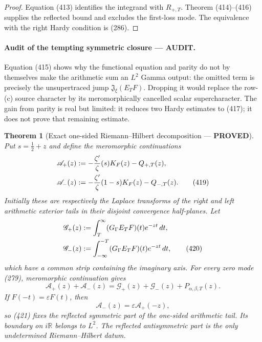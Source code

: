 \documentclass[11pt]{article}
\newtheorem{theorem}{Theorem}
\newcommand{\PROVED}{\textcolor{green!45!black}{\textbf{PROVED}}}
\newcommand{\AUDIT}{\textcolor{orange!75!black}{\textbf{AUDIT}}}
\begin{document}
\begin{proof}
Equation (413) identifies the integrand with $R_{+,T}$.  Theorem
(414)--(416) supplies the reflected bound and excludes the first-loss mode.
The equivalence with the right Hardy condition is (286).
\end{proof}

\paragraph{Audit of the tempting symmetric closure --- \AUDIT.}
Equation (415) shows why the functional equation and parity do not by
themselves make the arithmetic sum an $L^2$ Gamma output: the omitted term
is precisely the unsupertraced jump $\mathfrak J_\xi(E_TF)$.  Dropping it would
replace the row-(c) source character by its meromorphically cancelled scalar
supercharacter.  The gain from parity is real but limited: it reduces two
Hardy estimates to (417); it does not prove that remaining estimate.

\begin{theorem}[Exact one-sided Riemann--Hilbert decomposition --- \PROVED]
Put $s=\tfrac12+z$ and define the meromorphic continuations
\begin{align}
 \mathscr A_+(z)&:=-\frac{\zeta'}{\zeta}(s)K_F(z)-Q_{+,T}(z),\notag\\
 \mathscr A_-(z)&:=-\frac{\zeta'}{\zeta}(1-s)K_F(z)-Q_{-,T}(z).       \tag{419}
\end{align}
Initially these are respectively the Laplace transforms of the right and
left arithmetic exterior tails in their disjoint convergence half-planes.
Let
\begin{align}
 \mathscr G_+(z)&:=\int_T^\infty
          (G_\Gamma E_TF)(t)e^{-zt}\,dt,\notag\\
 \mathscr G_-(z)&:=\int_{-\infty}^{-T}
          (G_\Gamma E_TF)(t)e^{-zt}\,dt,             \tag{420}
\end{align}
which have a common strip containing the imaginary axis.  For every zero
mode (279), meromorphic continuation gives
\begin{equation}
 \boxed{\mathscr A_+(z)+\mathscr A_-(z)
 =\mathscr G_+(z)+\mathscr G_-(z)
  +P_{\alpha,\beta,T}(z).}                           \tag{421}
\end{equation}
If $F(-t)=\varepsilon F(t)$, then
\begin{equation}
 \mathscr A_-(z)=\varepsilon\mathscr A_+(-z),        \tag{422}
\end{equation}
so (421) fixes the reflected symmetric part of the one-sided arithmetic
tail.  Its boundary on $i\mathbb R$ belongs to $L^2$.  The reflected
antisymmetric part is the only undetermined Riemann--Hilbert datum.
\end{theorem}
\end{document}
